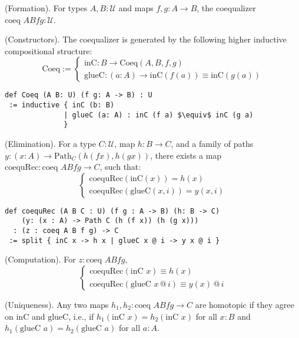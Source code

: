 \begin{definition} (Formation).
For types \( A, B : \mathcal{U} \) and maps \( f, g : A \to B \),
the coequalizer \( \text{coeq } A B f g : \mathcal{U} \).
\end{definition}

\begin{definition} (Constructors).
The coequalizer is generated by the following higher inductive compositional structure:
\[
\text{Coeq} :=
\begin{cases}
\text{inC} : B \to \text{Coeq}(A,B,f,g) \\
\text{glueC} : (a : A) \to \text{inC}(f(a)) \equiv \text{inC}(g(a))
\end{cases}
\]
\begin{lstlisting}[mathescape=true]
def Coeq (A B: U) (f g: A -> B) : U
 := inductive { inC (b: B)
              | glueC (a: A) : inC (f a) $\equiv$ inC (g a)
              }
\end{lstlisting}
\end{definition}

\begin{theorem} (Elimination).
For a type \( C : \mathcal{U} \), map \( h : B \to C \), and a family of paths \( y : (x : A) \to \text{Path}_C (h (f x), h (g x)) \), there exists a map \( \text{coequRec} : \text{coeq } A B f g \to C \), such that:
\[
\begin{cases}
\text{coequRec}(\text{inC}(x)) = h(x) \\
\text{coequRec}(\text{glueC}(x,i)) = y(x,i)
\end{cases}
\]
\begin{lstlisting}
def coequRec (A B C : U) (f g : A -> B) (h: B -> C)
    (y: (x : A) -> Path C (h (f x)) (h (g x)))
  : (z : coeq A B f g) -> C
 := split { inC x -> h x | glueC x @ i -> y x @ i }
\end{lstlisting}
\end{theorem}

\begin{theorem} (Computation).
For \( z : \text{coeq } A B f g \),
\[
\begin{cases}
\text{coequRec}(\text{inC } x) \equiv h(x) \\
\text{coequRec}(\text{glueC } x \, @ \, i) \equiv y(x) \, @ \, i
\end{cases}
\]
\end{theorem}

\begin{theorem} (Uniqueness).
Any two maps \( h_1, h_2 : \text{coeq } A B f g \to C \) are homotopic
if they agree on \( \text{inC} \) and \( \text{glueC} \), i.e.,
if \( h_1(\text{inC } x) = h_2(\text{inC } x) \) for
all \( x : B \) and \( h_1(\text{glueC } a) = h_2(\text{glueC } a) \) for all \( a : A \).
\end{theorem}

